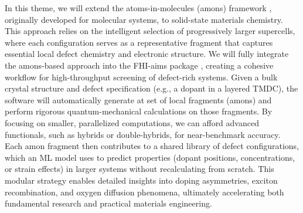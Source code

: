 \documentclass[11pt,english,calcwidth,compact]{nserc-appendix}
\begin{document}
In this theme, we will extend the atoms-in-molecules (amons) framework \cite{amons}, originally developed for molecular systems, to solid-state materials chemistry. This approach relies on the intelligent selection of progressively larger supercells, where each configuration serves as a representative fragment that captures essential local defect chemistry and electronic structure. We will fully integrate the amons-based approach into the FHI-aims package \cite{fhiaims}, creating a cohesive workflow for high-throughput screening of defect-rich systems. Given a bulk crystal structure and defect specification (e.g., a dopant in a layered TMDC), the software will automatically generate  at set of local fragments (amons) and perform rigorous quantum-mechanical calculations on those fragments. By focusing on smaller, parallelized computations, we can afford advanced functionals, such as hybrids or double-hybrids, for near-benchmark accuracy. Each amon fragment then contributes to a shared library of defect configurations, which an ML model uses to predict properties (dopant positions, concentrations, or strain effects) in larger systems without recalculating from scratch. This modular strategy enables detailed insights into doping asymmetries, exciton recombination, and oxygen diffusion phenomena, ultimately accelerating both fundamental research and practical materials engineering.
\end{document}

